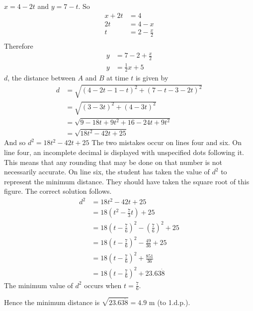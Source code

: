 \documentclass[a4paper,12pt]{article}
\numberwithin{equation}{section}
\begin{document}
\begin{question}
\qpart
$x=4-2t$ and $y=7-t$. So
\begin{align*}
x+2t&=4\\
2t&=4-x\\
t&=2-\frac{x}{2}\\
\end{align*}
Therefore
\begin{align*}
y&=7-2+\frac{x}{2}\\
y&=\frac{1}{2}x+5
\end{align*}
\qpart
$d$, the distance between $A$ and $B$ at time $t$ is given by
\begin{align*}
d&=\sqrt{(4-2t-1-t)^2+(7-t-3-2t)^2}\\
&=\sqrt{(3-3t)^2+(4-3t)^2}\\
&=\sqrt{9-18t+9t^2+16-24t+9t^2}\\
&=\sqrt{18t^2-42t+25}
\end{align*}
And so $d^2=18t^2-42t+25$
\qpart
The two mistakes occur on lines four and six. On line four, an incomplete decimal is displayed with unspecified dots following it. This means that any rounding that may be done on that number is not necessarily accurate. On line six, the student has taken the value of $d^2$ to represent the minimum distance. They should have taken the square root of this figure. The correct solution follows.
\begin{align*}
d^2&=18t^2-42t+25\\
&=18(t^2-\frac{7}{3}t)+25\\
&=18(t-\frac{7}{6})^2-(\frac{7}{6})^2+25\\
&=18(t-\frac{7}{6})^2-\frac{49}{36}+25\\
&=18(t-\frac{7}{6})^2+\frac{851}{36}\\
&=18(t-\frac{7}{6})^2+23.63\dot{8}
\end{align*}
The minimum value of $d^2$ occurs when $t=\frac{7}{6}$.

Hence the minimum distance is $\sqrt{23.63\dot{8}}=4.9$ m (to 1.d.p.).
\end{question}
\end{document}
